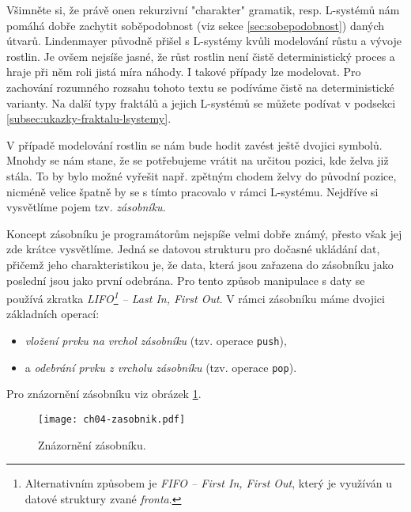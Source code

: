 Všimněte si, že právě onen rekurzivní "charakter" gramatik, resp. L-systémů nám pomáhá dobře zachytit soběpodobnost (viz sekce \ref{sec:sobepodobnost}) daných útvarů. Lindenmayer původně přišel s L-systémy kvůli modelování růstu a vývoje rostlin. Je ovšem nejsíše jasné, že růst rostlin není čistě deterministický proces a hraje při něm roli jistá míra náhody. \cite{Prusinkiewicz1990} I takové případy lze modelovat. Pro zachování rozumného rozsahu tohoto textu se podíváme čistě na deterministické varianty. Na další typy fraktálů a jejich L-systémů se můžete podívat v podsekci \ref{subsec:ukazky-fraktalu-lsystemy}.

V případě modelování rostlin se nám bude hodit zavést ještě dvojici symbolů. Mnohdy se nám stane, že se potřebujeme vrátit na určitou pozici, kde želva již stála. To by bylo možné vyřešit např. zpětným chodem želvy do původní pozice, nicméně velice špatně by se s tímto pracovalo v rámci L-systému. Nejdříve si vysvětlíme pojem tzv. \emph{zásobníku}.

Koncept zásobníku je programátorům nejspíše velmi dobře známý, přesto však jej zde krátce vysvětlíme. Jedná se datovou strukturu pro dočasné ukládání dat, přičemž jeho charakteristikou je, že data, která jsou zařazena do zásobníku jako poslední jsou jako první odebrána. Pro tento způsob manipulace s daty se používá zkratka \emph{LIFO\footnote{Alternativním způsobem je \emph{FIFO -- First In, First Out}, který je využíván u datové struktury zvané \emph{fronta}.} -- Last In, First Out}. V rámci zásobníku máme dvojici základních operací:
\begin{itemize}
    \item \emph{vložení prvku na vrchol zásobníku} (tzv. operace \texttt{push}), 
    \item a \emph{odebrání prvku z vrcholu zásobníku} (tzv. operace \texttt{pop}).
\end{itemize}
Pro znázornění zásobníku viz obrázek \ref{fig:zasobnik}.
\begin{figure}[h]
    \centering
    \texttt{[image: ch04-zasobnik.pdf]}
    \caption{Znázornění zásobníku.}
    \label{fig:zasobnik}
\end{figure}

